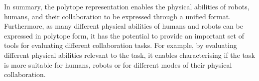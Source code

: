 In summary, the polytope representation enables the physical abilities of robots, humans, and their collaboration to be expressed through a unified format. Furthermore, as many different physical abilities of humans and robots can be expressed in polytope form, it has the potential to provide an important set of tools for evaluating different collaboration tasks.
For example, by evaluating different physical abilities relevant to the task, it enables characterising if the task is more suitable for humans, robots or for different modes of their physical collaboration.  




